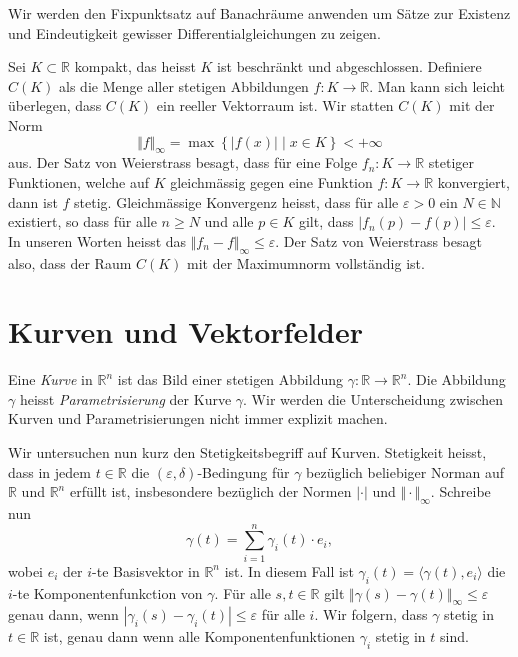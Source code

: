 \documentclass[../main.tex]{subfiles}
\begin{document}
Wir werden den Fixpunktsatz auf Banachräume
anwenden um Sätze zur Existenz und Eindeutigkeit
gewisser Differentialgleichungen zu zeigen.

\begin{example}
  Sei $K \subset \mathbb{R}$ kompakt,
  das heisst $K$ ist beschränkt und abgeschlossen.
  Definiere $C(K)$ als die Menge aller stetigen
  Abbildungen  $f \colon K \to \mathbb{R}$.
  Man kann sich leicht überlegen,
  dass $C(K)$ ein reeller Vektorraum ist.
  Wir statten $C(K)$ mit der Norm
  \[
    \Vert f \Vert_{\infty} =
    \max \left\{|f(x)| \mid x \in K\right\} < +\infty
  \]
  aus. Der Satz von Weierstrass besagt,
  dass für eine Folge $f_n \colon K \to \mathbb{R}$ 
  stetiger Funktionen, welche auf $K$ 
  gleichmässig gegen eine Funktion $f \colon K \to \mathbb{R}$
  konvergiert, dann ist $f$ stetig.
  Gleichmässige Konvergenz heisst,
  dass für alle $\varepsilon > 0$ 
  ein $N \in \mathbb{N}$ existiert, so dass
  für alle $n \geq N$ und alle $p \in K$ gilt,
  dass $|f_n(p) - f(p)| \leq \varepsilon$.
  In unseren Worten heisst das
  $\Vert f_n - f \Vert_{\infty} \leq \varepsilon$.
  Der Satz von Weierstrass besagt also,
  dass der Raum $C(K)$ mit der Maximumnorm vollständig ist.
\end{example}

\section{Kurven und Vektorfelder}
\begin{definition}
  Eine \emph{Kurve} in $\mathbb{R}^n$ 
  ist das Bild einer stetigen Abbildung
  $\gamma \colon \mathbb{R} \to \mathbb{R}^n$.
  Die Abbildung $\gamma$ heisst
  \emph{Parametrisierung} der Kurve $\gamma$.
  Wir werden die Unterscheidung zwischen Kurven
  und Parametrisierungen nicht immer explizit
  machen.
\end{definition}

Wir untersuchen nun kurz den Stetigkeitsbegriff auf Kurven.
Stetigkeit heisst, dass in jedem $t \in \mathbb{R}$ die
$(\varepsilon, \delta)$-Bedingung für $\gamma$ 
bezüglich beliebiger Norman auf $\mathbb{R}$ und $\mathbb{R}^n$ 
erfüllt ist, insbesondere
bezüglich der Normen $| \cdot |$ und $\Vert \cdot \Vert_{\infty}$.
Schreibe nun 
\[
  \gamma(t) = \sum_{i=1}^{n} \gamma_i(t) \cdot e_i,
\]
wobei $e_i$ der $i$-te Basisvektor in $\mathbb{R}^n$ ist.
In diesem Fall ist $\gamma_i(t) = \langle \gamma(t), e_i \rangle$ 
die $i$-te Komponentenfunkction von $\gamma$.
Für alle $s, t \in \mathbb{R}$ gilt
$\Vert \gamma(s) - \gamma(t) \Vert_\infty \leq \varepsilon$ 
genau dann, wenn $|\gamma_i(s) - \gamma_i(t)| \leq \varepsilon$
für alle  $i$.
Wir folgern, dass $\gamma$ stetig in $t \in \mathbb{R}$ 
ist, genau dann wenn alle Komponentenfunktionen
$\gamma_i$ stetig in $t$ sind.
\end{document}
